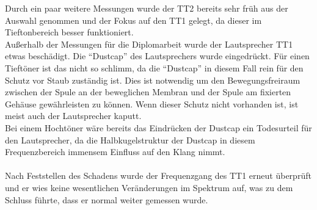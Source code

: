 \newpage
Durch ein paar weitere Messungen wurde der TT2 bereits sehr früh aus der Auswahl genommen und der Fokus auf den TT1 gelegt, da dieser im Tieftonbereich besser funktioniert.
\\
Außerhalb der Messungen für die Diplomarbeit wurde der Lautsprecher TT1 etwas beschädigt.
Die \enquote{Dustcap} des Lautsprechers wurde eingedrückt.
Für einen Tieftöner ist das nicht so schlimm, da die \enquote{Dustcap} in diesem Fall rein für den Schutz vor Staub zuständig ist.
Dies ist notwendig um den Bewegungsfreiraum zwischen der Spule an der beweglichen Membran und der Spule am fixierten Gehäuse gewährleisten zu können.
Wenn dieser Schutz nicht vorhanden ist, ist meist auch der Lautsprecher kaputt.\\
Bei einem Hochtöner wäre bereits das Eindrücken der Dustcap ein Todesurteil für den Lautsprecher, da die Halbkugelstruktur der Dustcap in diesem Frequenzbereich immensem Einfluss auf den Klang nimmt.
\\ \\
Nach Feststellen des Schadens wurde der Frequenzgang des TT1 erneut überprüft und er wies keine wesentlichen Veränderungen im Spektrum auf, was zu dem Schluss führte, dass er normal weiter gemessen wurde.
\\













